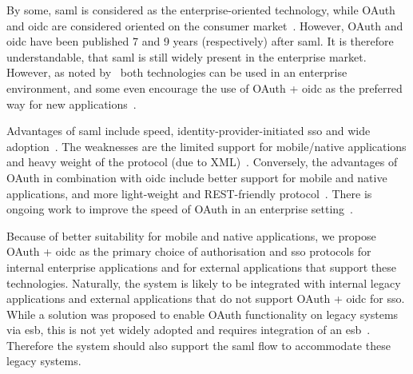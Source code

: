 By some, \acrshort{saml} is considered as the enterprise-oriented technology, while OAuth and \acrshort{oidc} are considered oriented on the consumer market~\cite{Fagbemi2016ComparingWS-Federation, SoftwareSecured2016Differentiating2, OneLoginInc.SAMLOAuth}. However, OAuth and \acrshort{oidc} have been published 7 and 9 years  (respectively) after \acrshort{saml}. It is therefore understandable, that \acrshort{saml} is still widely present in the enterprise market. However, as noted by~\cite{Naik2017SecuringConnect} both technologies can be used in an enterprise environment, and some even encourage the use of OAuth + \acrshort{oidc} as the preferred way for new applications~\cite{barbkess2019SingleDirectory}.

Advantages of \acrshort{saml} include speed, identity-provider-initiated \acrshort{sso} and wide adoption~\cite{OneLoginInc.SAMLOAuth, Naik2017SecuringConnect}. The weaknesses are the limited support for mobile/native applications and heavy weight of the protocol (due to XML)~\cite{Naik2017SecuringConnect}. Conversely, the advantages of OAuth in combination with \acrshort{oidc} include better support for mobile and native applications, and more light-weight and REST-friendly protocol~\cite{Naik2017SecuringConnect}. There is ongoing work to improve the speed of OAuth in an enterprise setting~\cite{Noureddine2011AEnterprise}.

Because of better suitability for mobile and native applications, we propose OAuth + \acrshort{oidc} as the primary choice of authorisation and \acrshort{sso} protocols for internal enterprise applications and for external applications that support these technologies. Naturally, the system is likely to be integrated with internal legacy applications and external applications that do not support OAuth + \acrshort{oidc} for \acrshort{sso}. While a solution was proposed to enable OAuth functionality on legacy systems via \acrfull{esb}, this is not yet widely adopted and requires integration of an \acrshort{esb}~\cite{deSousaRibeiro2018AnBus}. Therefore the system should also support the \acrshort{saml} flow to accommodate these legacy systems.



